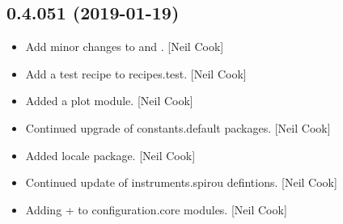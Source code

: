 \documentclass[a4paper,10pt,english]{report}
\begin{document}
\subsection{0.4.051 (2019-01-19)}
\label{\detokenize{misc/changelog:id212}}\begin{itemize}
\item {} 
Add minor changes to  and . {[}Neil Cook{]}

\item {} 
Add a test recipe to recipes.test. {[}Neil Cook{]}

\item {} 
Added a plot module. {[}Neil Cook{]}

\item {} 
Continued upgrade of constants.default packages. {[}Neil Cook{]}

\item {} 
Added locale package. {[}Neil Cook{]}

\item {} 
Continued update of instruments.spirou defintions. {[}Neil Cook{]}

\item {} 
Adding  +   to configuration.core modules. {[}Neil
Cook{]}

\end{itemize}
\end{document}
